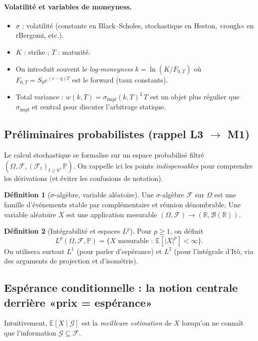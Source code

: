 \documentclass[11pt,a4paper]{report}
\theoremstyle{definition}
\newtheorem{definition}{Définition}[chapter]
\theoremstyle{plain}
\theoremstyle{remark}
\newcommand{\E}{\mathbb{E}}
\newcommand{\1}{\mathbf{1}}
\newcommand{\Pmeas}{\mathbb{P}}
\newcommand{\R}{\mathbb{R}}
\newcommand{\F}{\mathcal{F}}
\newcommand{\G}{\mathcal{G}}
\begin{document}
\paragraph{Volatilité et variables de moneyness.}
\begin{itemize}[leftmargin=*]
\item $\sigma$ : volatilité (constante en Black--Scholes, stochastique en Heston, «rough» en rBergomi, etc.).
\item $K$ : strike ; $T$ : maturité.
\item On introduit souvent le \emph{log-moneyness} $k=\ln(K/F_{0,T})$ où $F_{0,T}=S_0e^{(r-q)T}$ est le forward (taux constants).
\item Total variance : $w(k,T)=\sigma_{\text{impl}}(k,T)^2\,T$ est un objet plus régulier que $\sigma_{\text{impl}}$ et central pour discuter l'arbitrage statique.
\end{itemize}

\subsection*{Préliminaires probabilistes (rappel L3 $\to$ M1)}
Le calcul stochastique se formalise sur un espace probabilisé filtré $(\Omega,\F,(\F_t)_{t\ge 0},\Pmeas)$. On rappelle ici les points \emph{indispensables} pour comprendre les dérivations (et éviter les confusions de notation).

\begin{definition}[$\sigma$-algèbre, variable aléatoire]
Une $\sigma$-algèbre $\F$ sur $\Omega$ est une famille d'événements stable par complémentaire et réunion dénombrable.
Une variable aléatoire $X$ est une application mesurable $(\Omega,\F)\to(\R,\mathcal{B}(\R))$.
\end{definition}

\begin{definition}[Intégrabilité et espaces $L^p$]
Pour $p\ge 1$, on définit
\[
L^p(\Omega,\F,\Pmeas)=\{X \text{ mesurable }:\ \E[|X|^p]<\infty\}.
\]
On utilisera surtout $L^1$ (pour parler d'espérance) et $L^2$ (pour l'intégrale d'Itô, via des arguments de projection et d'isométrie).
\end{definition}

\subsection*{Espérance conditionnelle : la notion centrale derrière «prix = espérance»}
Intuitivement, $\E[X\mid \G]$ est la \emph{meilleure estimation} de $X$ lorsqu'on ne connaît que l'information $\G\subseteq\F$.
\end{document}
